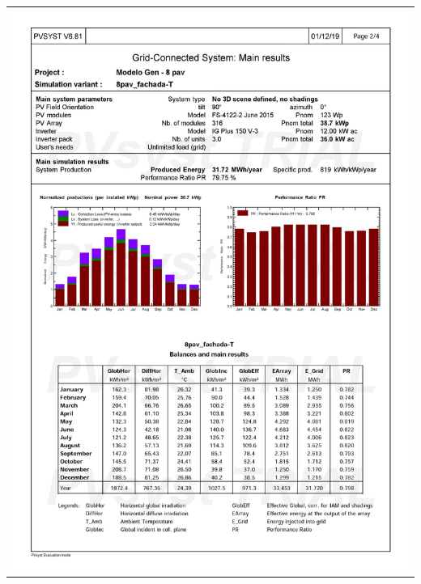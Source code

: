 \begin{table}[H]
    \centering
    \begin{tabular}{l}
        \includegraphics[width=\textwidth]{figures/attachments/resultpv12.jpg}
    \end{tabular}
\end{table}
\pagebreak
